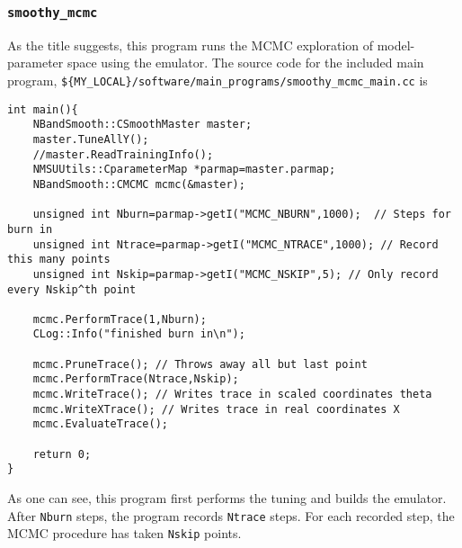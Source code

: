 \documentclass[UserManual.tex]{subfiles}
\begin{document}
\subsubsection{{\tt smoothy\_mcmc}}
As the title suggests, this program runs the MCMC exploration of model-parameter space using the emulator. The source code for the included main program, {\tt \$\{MY\_LOCAL\}/software/main\_programs/smoothy\_mcmc\_main.cc} is
{\tt \begin{verbatim}
int main(){
	NBandSmooth::CSmoothMaster master;
	master.TuneAllY();
	//master.ReadTrainingInfo();
	NMSUUtils::CparameterMap *parmap=master.parmap;
	NBandSmooth::CMCMC mcmc(&master);
	
	unsigned int Nburn=parmap->getI("MCMC_NBURN",1000);  // Steps for burn in
	unsigned int Ntrace=parmap->getI("MCMC_NTRACE",1000); // Record this many points
	unsigned int Nskip=parmap->getI("MCMC_NSKIP",5); // Only record every Nskip^th point
		
	mcmc.PerformTrace(1,Nburn);	
	CLog::Info("finished burn in\n");
	
	mcmc.PruneTrace(); // Throws away all but last point
	mcmc.PerformTrace(Ntrace,Nskip);
	mcmc.WriteTrace(); // Writes trace in scaled coordinates theta
	mcmc.WriteXTrace(); // Writes trace in real coordinates X
	mcmc.EvaluateTrace();

	return 0;
}
\end{verbatim}}
As one can see, this program first performs the tuning and builds the emulator. After {\tt Nburn} steps, the program records {\tt Ntrace} steps. For each recorded step, the MCMC procedure has taken {\tt Nskip} points. 
\end{document}
